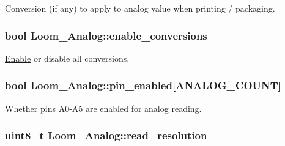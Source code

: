 Conversion (if any) to apply to analog value when printing / packaging. 

\subsubsection[{\texorpdfstring{enable\+\_\+conversions}{enable_conversions}}]{\setlength{\rightskip}{0pt plus 5cm}bool Loom\+\_\+\+Analog\+::enable\+\_\+conversions\hspace{0.3cm}{\ttfamily [protected]}}\hypertarget{class_loom___analog_ab1be771ab1dfad8ddb955c42ba3a3de6}{}\label{class_loom___analog_ab1be771ab1dfad8ddb955c42ba3a3de6}


\hyperlink{namespace_enable}{Enable} or disable all conversions. 

\subsubsection[{\texorpdfstring{pin\+\_\+enabled}{pin_enabled}}]{\setlength{\rightskip}{0pt plus 5cm}bool Loom\+\_\+\+Analog\+::pin\+\_\+enabled\mbox{[}{\bf A\+N\+A\+L\+O\+G\+\_\+\+C\+O\+U\+NT}\mbox{]}\hspace{0.3cm}{\ttfamily [protected]}}\hypertarget{class_loom___analog_a1111168ede4b93a1507e0cd67d849fd7}{}\label{class_loom___analog_a1111168ede4b93a1507e0cd67d849fd7}


Whether pins A0-\/\+A5 are enabled for analog reading. 

\subsubsection[{\texorpdfstring{read\+\_\+resolution}{read_resolution}}]{\setlength{\rightskip}{0pt plus 5cm}uint8\+\_\+t Loom\+\_\+\+Analog\+::read\+\_\+resolution\hspace{0.3cm}{\ttfamily [protected]}}\hypertarget{class_loom___analog_a8593018496b601b75eec9a1df44574fb}{}\label{class_loom___analog_a8593018496b601b75eec9a1df44574fb}



